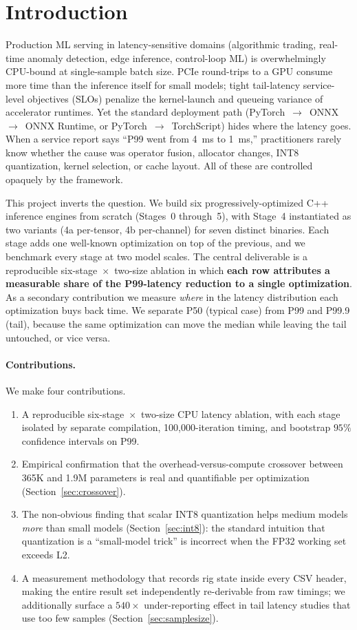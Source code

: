 \documentclass{article}
\begin{document}
\section{Introduction}
\label{sec:intro}

Production ML serving in latency-sensitive domains (algorithmic trading, real-time anomaly detection, edge inference, control-loop ML) is overwhelmingly CPU-bound at single-sample batch size.
PCIe round-trips to a GPU consume more time than the inference itself for small models; tight tail-latency service-level objectives (SLOs) penalize the kernel-launch and queueing variance of accelerator runtimes.
Yet the standard deployment path (PyTorch~$\to$~ONNX~$\to$~ONNX Runtime, or PyTorch~$\to$~TorchScript) hides where the latency goes.
When a service report says ``P99 went from 4~ms to 1~ms,'' practitioners rarely know whether the cause was operator fusion, allocator changes, INT8 quantization, kernel selection, or cache layout.
All of these are controlled opaquely by the framework.

This project inverts the question.
We build six progressively-optimized C++ inference engines from scratch (Stages~0 through~5), with Stage~4 instantiated as two variants (4a per-tensor, 4b per-channel) for seven distinct binaries.
Each stage adds one well-known optimization on top of the previous, and we benchmark every stage at two model scales.
The central deliverable is a reproducible six-stage~$\times$~two-size ablation in which \textbf{each row attributes a measurable share of the P99-latency reduction to a single optimization}.
As a secondary contribution we measure \emph{where} in the latency distribution each optimization buys back time.
We separate P50 (typical case) from P99 and P99.9 (tail), because the same optimization can move the median while leaving the tail untouched, or vice versa.

\paragraph{Contributions.}
We make four contributions.
\begin{enumerate}
\item A reproducible six-stage~$\times$~two-size CPU latency ablation, with each stage isolated by separate compilation, 100{,}000-iteration timing, and bootstrap $95\%$ confidence intervals on P99.
\item Empirical confirmation that the overhead-versus-compute crossover between 365K and 1.9M parameters is real and quantifiable per optimization (Section~\ref{sec:crossover}).
\item The non-obvious finding that scalar INT8 quantization helps medium models \emph{more} than small models (Section~\ref{sec:int8}): the standard intuition that quantization is a ``small-model trick'' is incorrect when the FP32 working set exceeds L2.
\item A measurement methodology that records rig state inside every CSV header, making the entire result set independently re-derivable from raw timings; we additionally surface a $540\times$ under-reporting effect in tail latency studies that use too few samples (Section~\ref{sec:samplesize}).
\end{enumerate}
\end{document}
